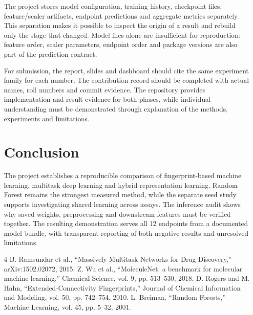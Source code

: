 \documentclass[11pt,a4paper]{article}\usepackage[margin=25mm]{geometry}\usepackage{fancyhdr}\usepackage{setspace}\usepackage{titlesec}\usepackage{xcolor}
\begin{document}
The project stores model configuration, training history, checkpoint files, feature/scaler artifacts, endpoint predictions and aggregate metrics separately. This separation makes it possible to inspect the origin of a result and rebuild only the stage that changed. Model files alone are insufficient for reproduction: feature order, scaler parameters, endpoint order and package versions are also part of the prediction contract.

For submission, the report, slides and dashboard should cite the same experiment family for each number. The contribution record should be completed with actual names, roll numbers and commit evidence. The repository provides implementation and result evidence for both phases, while individual understanding must be demonstrated through explanation of the methods, experiments and limitations.


\section{Conclusion}
The project establishes a reproducible comparison of fingerprint-based machine learning, multitask deep learning and hybrid representation learning. Random Forest remains the strongest measured method, while the separate seed study supports investigating shared learning across assays. The inference audit shows why saved weights, preprocessing and downstream features must be verified together. The resulting demonstration serves all 12 endpoints from a documented model bundle, with transparent reporting of both negative results and unresolved limitations.

\begin{thebibliography}{4}
 B. Ramsundar et al., ``Massively Multitask Networks for Drug Discovery,'' arXiv:1502.02072, 2015.
 Z. Wu et al., ``MoleculeNet: a benchmark for molecular machine learning,'' Chemical Science, vol. 9, pp. 513--530, 2018.
 D. Rogers and M. Hahn, ``Extended-Connectivity Fingerprints,'' Journal of Chemical Information and Modeling, vol. 50, pp. 742--754, 2010.
 L. Breiman, ``Random Forests,'' Machine Learning, vol. 45, pp. 5--32, 2001.
\end{thebibliography}
\end{document}
